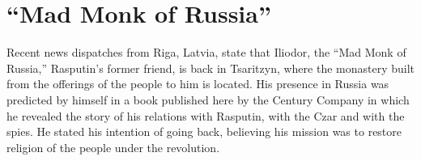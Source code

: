 \section{``Mad Monk of Russia''}
Recent news dispatches from Riga, Latvia, state that Iliodor,
the ``Mad Monk of Russia,'' Rasputin's former friend, is back in Tsaritzyn,
where the monastery built from the offerings of the people to him is located.
His presence in Russia was predicted by himself in a book published here by the Century Company in which
he revealed the story of his relations with Rasputin,
with the Czar and with the spies.
He stated his intention of going back,
believing his mission was to restore religion of the people under the revolution.

